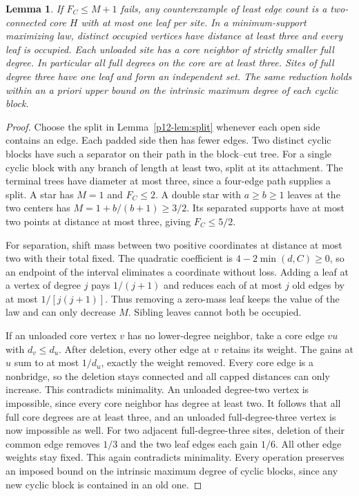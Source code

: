 \documentclass[11pt,a4paper]{article}
\newtheorem{lemma}[theorem]{Lemma}\newtheorem{corollary}[theorem]{Corollary}
\begin{document}
\begin{lemma}\label{p12-lem:minimal}
If $F_C\le M+1$ fails, any counterexample of least edge count is a two-connected core $H$ with at most one leaf per site. In a minimum-support maximizing law, distinct occupied vertices have distance at least three and every leaf is occupied. Each unloaded site has a core neighbor of strictly smaller full degree. In particular all full degrees on the core are at least three. Sites of full degree three have one leaf and form an independent set. The same reduction holds within an a priori upper bound on the intrinsic maximum degree of each cyclic block.
\end{lemma}
\begin{proof}
Choose the split in Lemma~\ref{p12-lem:split} whenever each open side contains an edge. Each padded side then has fewer edges. Two distinct cyclic blocks have such a separator on their path in the block--cut tree. For a single cyclic block with any branch of length at least two, split at its attachment. The terminal trees have diameter at most three, since a four-edge path supplies a split. A star has $M=1$ and $F_C\le2$. A double star with $a\ge b\ge1$ leaves at the two centers has $M=1+b/(b+1)\ge3/2$. Its separated supports have at most two points at distance at most three, giving $F_C\le5/2$.

For separation, shift mass between two positive coordinates at distance at most two with their total fixed. The quadratic coefficient is $4-2\min(d,C)\ge0$, so an endpoint of the interval eliminates a coordinate without loss. Adding a leaf at a vertex of degree $j$ pays $1/(j+1)$ and reduces each of at most $j$ old edges by at most $1/[j(j+1)]$. Thus removing a zero-mass leaf keeps the value of the law and can only decrease $M$. Sibling leaves cannot both be occupied.

If an unloaded core vertex $v$ has no lower-degree neighbor, take a core edge $vu$ with $d_v\le d_u$. After deletion, every other edge at $v$ retains its weight. The gains at $u$ sum to at most $1/d_u$, exactly the weight removed. Every core edge is a nonbridge, so the deletion stays connected and all capped distances can only increase. This contradicts minimality. An unloaded degree-two vertex is impossible, since every core neighbor has degree at least two. It follows that all full core degrees are at least three, and an unloaded full-degree-three vertex is now impossible as well. For two adjacent full-degree-three sites, deletion of their common edge removes $1/3$ and the two leaf edges each gain $1/6$. All other edge weights stay fixed. This again contradicts minimality. Every operation preserves an imposed bound on the intrinsic maximum degree of cyclic blocks, since any new cyclic block is contained in an old one.
\end{proof}
\end{document}

